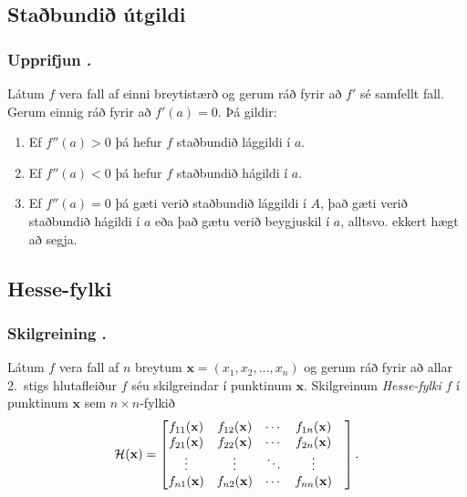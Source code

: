 \subsection{Staðbundið útgildi} 

\subsubsection{Upprifjun \kaflanr.}
 Látum $f$ vera fall af einni breytistærð og
gerum ráð fyrir að $f'$ sé samfellt fall.  Gerum einnig ráð fyrir að
$f'(a)=0$.  Þá gildir: 

\begin {enumerate}
 \item Ef $f''(a)>0$ þá hefur $f$ staðbundið lággildi í $a$.
 \item  Ef $f''(a)<0$ þá hefur $f$ staðbundið hágildi í $a$.
 \item  Ef $f''(a)=0$ þá gæti verið staðbundið lággildi í $A$, það gæti
     verið staðbundið hágildi í $a$ eða það gætu verið beygjuskil í
     $a$, alltsvo. ekkert hægt að segja. 
 \end {enumerate}






\subsection{Hesse-fylki} 

\subsubsection{Skilgreining \kaflanr.}
Látum $f$ vera fall af $n$ breytum $\mathbf{x} = (x_1,x_2,\ldots,x_n)$ og
gerum ráð fyrir að allar 2.~stigs hlutafleiður $f$ séu skilgreindar í
punktinum $\mathbf{x}$.  Skilgreinum  {\em \color{red} Hesse-fylki} $f$ í punktinum
$\mathbf{x}$ sem $n\times n$-fylkið
$${\cal H}(\mathbf{x})=\begin{bmatrix} f_{11}(\mathbf{x})&f_{12}(\mathbf{x}) & \cdots & f_{1n}(\mathbf{x})\\
 f_{21}(\mathbf{x})&f_{22}(\mathbf{x}) & \cdots & f_{2n}(\mathbf{x}) \\
 \vdots & \vdots & \ddots & \vdots & \\
  f_{n1}(\mathbf{x})&f_{n2}(\mathbf{x}) & \cdots & f_{nn}(\mathbf{x})\end{bmatrix}.$$



